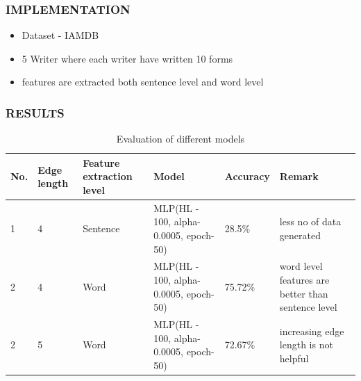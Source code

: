 \documentclass{beamer}
\begin{document}
	\begin{frame}
		\frametitle{IMPLEMENTATION}
		\begin{itemize}
			\item Dataset - IAMDB
			\item 5 Writer where each writer have written 10 forms
			\item features are extracted both sentence level and word level
		\end{itemize}
	\end{frame}

	\begin{frame}
		\frametitle{RESULTS}
		\begin{table}
			\centering
			\label{tab:evaluation}
			\setlength{\tabcolsep}{2pt}
			\begin{tabular}{|p{1cm}|p{2cm}|p{2cm}|p{2cm}|p{2cm}|p{2cm}|}
				\hline
				\textbf{No.} & \textbf{Edge length} & \textbf{Feature extraction level} & \textbf{Model}  & \textbf{Accuracy} & \textbf{Remark} \\ \hline
				1 & 4 & Sentence & MLP(HL - 100, alpha-0.0005, epoch-50) & 28.5\% & less no of data generated \\ \hline
				2 & 4 & Word & MLP(HL - 100, alpha-0.0005, epoch-50) & 75.72\% & word level features are better than sentence level \\ \hline
				2 & 5 & Word & MLP(HL - 100, alpha-0.0005, epoch-50) & 72.67\% & increasing edge length is not helpful\\ \hline
			\end{tabular}
			\caption{Evaluation of different models}			
		\end{table}
	\end{frame}
\end{document}
